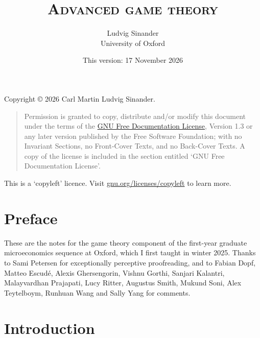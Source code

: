 \documentclass[11pt,letterpaper,reqno,oneside]{book}
\title{\scshape Advanced game theory}
\author{Ludvig Sinander \\
University of Oxford}
\date{\small This version: 17 November 2026}
\begin{document}
\maketitle

\pagebreak
\hspace{1pt}\vfill
\noindent
Copyright \copyright{} 2026 Carl Martin Ludvig Sinander.

\begin{quotation}
\noindent
Permission is granted to copy, distribute and/or modify this document under the terms of the \href{https://www.gnu.org/licenses/fdl}{GNU Free Documentation License}, Version 1.3 or any later version published by the Free Software Foundation; with no Invariant Sections, no Front-Cover Texts, and no Back-Cover Texts. A copy of the license is included in the section entitled `GNU
Free Documentation License'.
\end{quotation}

\noindent
This is a `copyleft' licence.
Visit \href{https://www.gnu.org/licenses/copyleft}{gnu.org/licenses/copyleft} to learn more.



\chapter*{Preface}
\label{preface}

These are the notes for the game theory component of the first-year graduate microeconomics sequence at Oxford, which I first taught in winter 2025.
Thanks to Sami Petersen for exceptionally perceptive proofreading, and to Fabian Dopf, Matteo Escudé, Alexis Ghersengorin, Vishnu Gorthi, Sanjari Kalantri, Malayvardhan Prajapati, Lucy Ritter, Augustus Smith, Mukund Soni, Alex Teytelboym, Runhuan Wang and Sally Yang for comments.



\pagebreak
{}
\setcounter{tocdepth}{1}
\tableofcontents
{}



\setcounter{chapter}{-1}
\chapter{Introduction}
\label{ch0}
\end{document}
